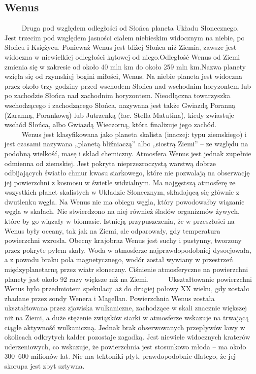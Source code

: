 \documentclass[12pt, letterpaper, titlepage]{article}
\begin{document}
\subsection{Wenus}
\ \ \ \ \ Druga pod względem odległości od Słońca planeta Układu Słonecznego. Jest trzecim pod względem jasności ciałem niebieskim widocznym na niebie, po Słońcu i Księżycu. Ponieważ Wenus jest bliżej Słońca niż Ziemia, zawsze jest widoczna w niewielkiej odległości kątowej od niego.Odległość Wenus od Ziemi zmienia się w zakresie od około 40 mln km do około 259 mln km.Nazwa planety wzięła się od rzymskiej bogini miłości, Wenus. Na niebie planeta jest widoczna przez około trzy godziny przed wschodem Słońca nad wschodnim horyzontem lub po zachodzie Słońca nad zachodnim horyzontem. Nieodłączna towarzyszka wschodzącego i zachodzącego Słońca, nazywana jest także Gwiazdą Poranną (Zaranną, Porankową) lub Jutrzenką (łac. Stella Matutina), kiedy zwiastuje wschód Słońca, albo Gwiazdą Wieczorną, która finalizuje jego zachód.
\newline
\newline 
\ \ \ \ \ Wenus jest klasyfikowana jako planeta skalista (inaczej: typu ziemskiego) i jest czasami nazywana „planetą bliźniaczą” albo „siostrą Ziemi” – ze względu na podobną wielkość, masę i skład chemiczny. Atmosfera Wenus jest jednak zupełnie odmienna od ziemskiej. Jest pokryta nieprzezroczystą warstwą dobrze odbijających światło chmur kwasu siarkowego, które nie pozwalają na obserwację jej powierzchni z kosmosu w świetle widzialnym. Ma najgęstszą atmosferę ze wszystkich planet skalistych w Układzie Słonecznym, składającą się głównie z dwutlenku węgla. Na Wenus nie ma obiegu węgla, który powodowałby wiązanie węgla w skałach. Nie stwierdzono na niej również śladów organizmów żywych, które by go wiązały w biomasie. Istnieją przypuszczenia, że w przeszłości na Wenus były oceany, tak jak na Ziemi, ale odparowały, gdy temperatura powierzchni wzrosła. Obecny krajobraz Wenus jest suchy i pustynny, tworzony przez pokryte pyłem skały. Woda w atmosferze najprawdopodobniej dysocjowała, a z powodu braku pola magnetycznego, wodór został wywiany w przestrzeń międzyplanetarną przez wiatr słoneczny. Ciśnienie atmosferyczne na powierzchni planety jest około 92 razy większe niż na Ziemi.
\newline
\newline 
\ \ \ \ \ Ukształtowanie powierzchni Wenus było przedmiotem spekulacji aż do drugiej połowy XX wieku, gdy zostało zbadane przez sondy Wenera i Magellan. Powierzchnia Wenus została ukształtowana przez zjawiska wulkaniczne, zachodzące w skali znacznie większej niż na Ziemi, a duże stężenie związków siarki w atmosferze wskazuje na trwającą ciągle aktywność wulkaniczną. Jednak brak obserwowanych przepływów lawy w okolicach odkrytych kalder pozostaje zagadką. Jest niewiele widocznych kraterów uderzeniowych, co wskazuje, że powierzchnia jest stosunkowo młoda – ma około 300–600 milionów lat. Nie ma tektoniki płyt, prawdopodobnie dlatego, że jej skorupa jest zbyt sztywna.
\newpage
\end{document}
